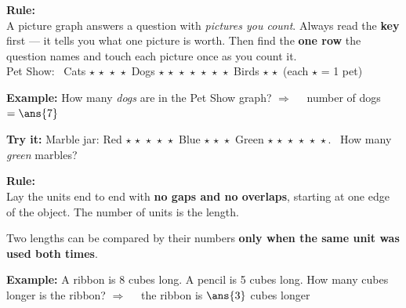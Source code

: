 \documentclass[12pt]{article}
\begin{document}


\begin{formulabox}
\textbf{Rule:}\\[3pt]
A picture graph answers a question with \emph{pictures you count}. Always read the
\textbf{key} first --- it tells you what one picture is worth. Then find the \textbf{one
row} the question names and touch each picture once as you count it.\\[2pt]
{\small Pet Show: \ Cats $\star\,\star\,\star\,\star$ \quad Dogs
$\star\,\star\,\star\,\star\,\star\,\star\,\star$ \quad Birds $\star\,\star$ \quad
(each $\star$ = 1 pet)}
\end{formulabox}

\begin{examplebox}
\textbf{Example:} \quad How many \emph{dogs} are in the Pet Show graph?
$\Rightarrow\quad$ number of dogs $= \ans{7}$
\end{examplebox}

\begin{tryitbox}
\textbf{Try it:} \quad Marble jar: Red $\star\,\star\,\star\,\star\,\star$ \quad Blue
$\star\,\star\,\star$ \quad Green $\star\,\star\,\star\,\star\,\star\,\star$. \ How many
\emph{green} marbles?\\[2pt]
\end{tryitbox}


\begin{formulabox}
\textbf{Rule:}\\[3pt]
Lay the units end to end with \textbf{no gaps and no overlaps}, starting at one edge of
the object. The number of units is the length.\par
Two lengths can be compared by their numbers \textbf{only when the same unit was used
both times}.
\end{formulabox}

\begin{examplebox}
\textbf{Example:} \quad A ribbon is 8 cubes long. A pencil is 5 cubes long. How many cubes
longer is the ribbon?
$\Rightarrow\quad$ the ribbon is $\ans{3}$ cubes longer
\end{examplebox}
\end{document}
